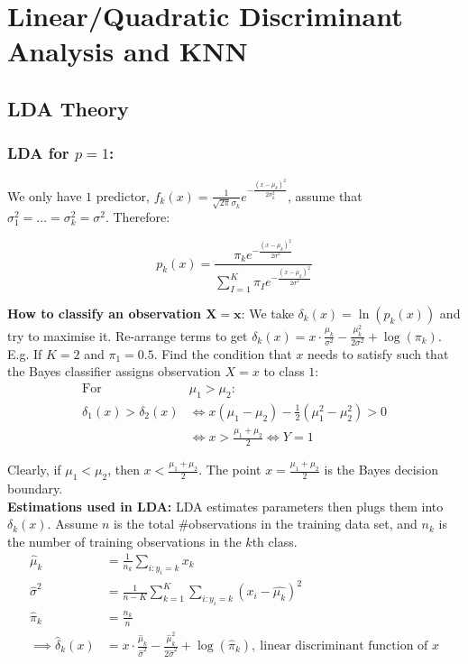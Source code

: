 \documentclass[11pt]{article}
\begin{document}
\section{Linear/Quadratic Discriminant Analysis and KNN}
\subsection{LDA Theory}

\subsubsection{LDA for $p = 1$:}
\noindent We only have $1$ predictor, $f_k(x) = \frac{1}{\sqrt{2\pi}\sigma_{k}}e^{-\frac{(x-\mu_k)^2}{2\sigma_{k}^{2}}}$, assume that $\sigma_1^2 = ... = \sigma_k^2 = \sigma^2$. Therefore:

$$p_k(x) = \frac{\pi_k e^{-\frac{(x - \mu_k)^2}{2\sigma^2}}}{\sum_{I=1}^{K}{\pi_I  e^{-\frac{(x - \mu_k)^2}{2\sigma^2}}}}$$

\noindent \textbf{How to classify an observation $\boldsymbol{X = x}$}: We take $\delta_k(x) = \ln(p_k(x))$ and try to maximise it. Re-arrange terms to get $\delta_k(x) = x \cdot \frac{\mu_k}{\sigma^2} - \frac{\mu_k^2}{2\sigma^2} + \log(\pi_k)$. \\

\noindent E.g. If $K=2$ and $\pi_1 = 0.5$. Find the condition that $x$ needs to satisfy such that the Bayes classifier assigns observation $X=x$ to class $1$: \\

\begin{align*}
    \text{For } & \mu_1 > \mu_2: \\
    \delta_1(x) > \delta_{2}(x) &\Leftrightarrow x(\mu_1 - \mu_2) - \frac{1}{2}(\mu_1^2 - \mu_2^2) > 0 \\
    &\Leftrightarrow x > \frac{\mu_1 + \mu_2}{2} \Leftrightarrow Y = 1
\end{align*}

\noindent Clearly, if $\mu_1 < \mu_2$, then $x < \frac{\mu_1 + \mu_2}{2}$. The point $x = \frac{\mu_1 + \mu_2}{2}$ is the Bayes decision boundary. \\

\noindent \textbf{Estimations used in LDA:} LDA estimates parameters then plugs them into $\delta_k(x)$. Assume $n$ is the total \#observations in the training data set, and $n_k$ is the number of training observations in the $k$th class. \\

\begin{align*}
    \hat{\mu}_k &= \frac{1}{n_k} \sum_{i: y_i = k}{x_k} \\
    \hat{\sigma}^2 &= \frac{1}{n-K}\sum_{k=1}^{K}\sum_{i: y_i = k}(x_i - \hat{\mu_k})^2 \\
    \hat{\pi}_k &= \frac{n_k}{n} \\
    \implies \hat{\delta}_k(x) &= x \cdot \frac{\hat{\mu}_k}{\hat{\sigma}^2} - \frac{\hat{\mu}_k^2}{2\hat{\sigma}^2} + \log(\hat{\pi}_k), \ \text{linear discriminant function of $x$}
\end{align*}
\end{document}

